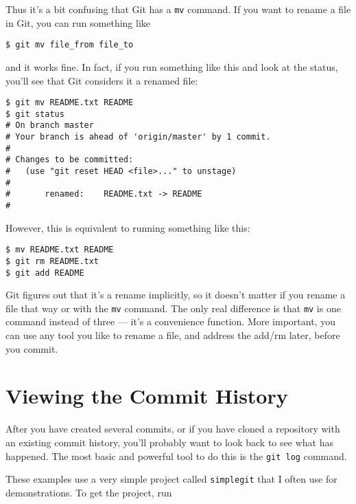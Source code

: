\documentclass[a4paper]{book}
\begin{document}
Thus it's a bit confusing that Git has a \texttt{mv} command. If you want to rename a file in Git, you can run something like

\begin{shaded}\begin{verbatim}
$ git mv file_from file_to
\end{verbatim}\end{shaded}

and it works fine. In fact, if you run something like this and look at the status, you'll see that Git considers it a renamed file:

\begin{shaded}\begin{verbatim}
$ git mv README.txt README
$ git status
# On branch master
# Your branch is ahead of 'origin/master' by 1 commit.
#
# Changes to be committed:
#   (use "git reset HEAD <file>..." to unstage)
#
#       renamed:    README.txt -> README
#
\end{verbatim}\end{shaded}

However, this is equivalent to running something like this:

\begin{shaded}\begin{verbatim}
$ mv README.txt README
$ git rm README.txt
$ git add README
\end{verbatim}\end{shaded}

Git figures out that it's a rename implicitly, so it doesn't matter if you rename a file that way or with the \texttt{mv} command. The only real difference is that \texttt{mv} is one command instead of three --- it's a convenience function. More important, you can use any tool you like to rename a file, and address the add/rm later, before you commit.

\section{Viewing the Commit History}

After you have created several commits, or if you have cloned a repository with an existing commit history, you'll probably want to look back to see what has happened. The most basic and powerful tool to do this is the \texttt{git log} command.

These examples use a very simple project called \texttt{simplegit} that I often use for demonstrations. To get the project, run
\end{document}
